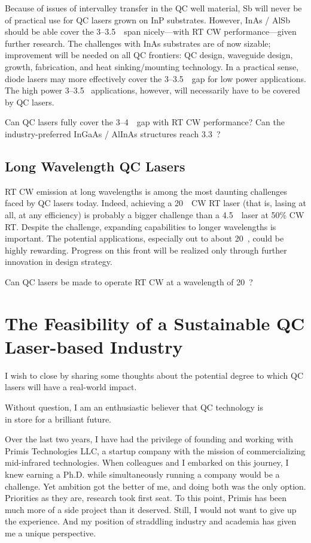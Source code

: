 Because of issues of intervalley transfer in the QC well material, Sb will never be of practical use for QC lasers grown on InP substrates.  However, InAs / AlSb should be able cover the 3--3.5~\um\ span nicely---with RT CW performance---given further research.  The challenges with InAs substrates are of now sizable;  improvement will be needed on all QC frontiers: QC design, waveguide design, growth, fabrication, and heat sinking/mounting technology.  In a practical sense, diode lasers may more effectively cover the 3--3.5~\um\ gap for low power applications. The high power 3--3.5 \um\ applications, however, will necessarily have to be covered by QC lasers.

\medskip

\noindent
{} \quad  Can QC lasers fully cover the 3--4~\um\ gap with RT CW performance?  Can the industry-preferred InGaAs / AlInAs structures reach 3.3~\um?


\subsection{Long Wavelength QC Lasers}

RT CW emission at long wavelengths is among the most daunting challenges faced by QC lasers today.  Indeed, achieving a 20~\um\ CW RT laser (that is, lasing at all, at any efficiency) is probably a bigger challenge than a 4.5~\um\ laser at 50\% CW RT.  Despite the challenge, expanding capabilities to longer wavelengths is important.  The potential applications, especially out to about 20~\um, could be highly rewarding.  Progress on this front will be realized only through further innovation in design strategy.

\medskip

\noindent
{} \quad  Can QC lasers be made to operate RT CW at a wavelength of 20~\um?


\section{The Feasibility of a Sustainable QC Laser-based Industry}

I wish to close by sharing some thoughts about the potential degree to which QC lasers will have a real-world impact.
\begin{center}
Without question, I am an enthusiastic believer that QC technology is \\
in store for a brilliant future.
\end{center}
Over the last two years, I have had the privilege of founding and working with Primis Technologies LLC, a startup company with the mission of commercializing mid-infrared technologies.  When colleagues and I embarked on this journey, I knew earning a Ph.D. while simultaneously running a company would be a challenge. Yet ambition got the better of me, and doing both was the only option.  Priorities as they are, research took first seat.  To this point, Primis has been much more of a side project than it deserved.  Still, I would not want to give up the experience.  And my position of straddling industry and academia has given me a unique perspective.

